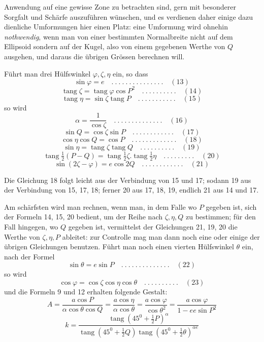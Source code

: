 %
Anwendung auf eine gewisse Zone zu betrachten sind, gern mit besonderer Sorgfalt und Schärfe auszuführen wünschen, und es verdienen daher einige dazu dienliche Umformungen hier einen Platz: eine Umformung wird ohnehin \textit{nothwendig}, wenn man von einer bestimmten Normalbreite nicht auf dem Ellipsoid sondern auf der Kugel, also von einem gegebenen Werthe von \(Q\) ausgehen, und daraus die übrigen Grössen berechnen will.

Führt man drei Hülfswinkel \(\varphi,\zeta,\eta\) ein, so dass
\[
\sin\varphi=e \quad .\ .\ .\ .\ .\ .\ .\ .\ .\ .\ .\ .\ .\ .\ .\quad(13)
\]
\[
\operatorname{tang}\zeta=\operatorname{tang}\varphi\cos P^2 \quad .\ .\ .\ .\ .\ .\ .\ .\ .\ .\quad(14)
\]
\[
\operatorname{tang}\eta=\sin\zeta\operatorname{tang}P \quad .\ .\ .\ .\ .\ .\ .\ .\ .\ .\ .\quad(15)
\]
so wird
\[
\alpha=\frac{1}{\cos\zeta} \quad .\ .\ .\ .\ .\ .\ .\ .\ .\ .\ .\ .\ .\ .\quad(16)
\]
\[
\sin Q=\cos\zeta\sin P \quad .\ .\ .\ .\ .\ .\ .\ .\ .\ .\ .\ .\quad(17)
\]
\[
\cos\eta\cos Q=\cos P \quad .\ .\ .\ .\ .\ .\ .\ .\ .\ .\ .\ .\ .\quad(18)
\]
\[
\sin\eta=\operatorname{tang}\zeta\operatorname{tang}Q \quad .\ .\ .\ .\ .\ .\ .\ .\ .\ .\quad(19)
\]
\[
\operatorname{tang}\tfrac{1}{2}(P-Q)=\operatorname{tang}\tfrac{1}{2}\zeta\mathord{.}\operatorname{tang}\tfrac{1}{2}\eta \quad .\ .\ .\ .\ .\ .\ .\ .\ .\quad(20)
\]
\[
\sin(2\zeta-\varphi)=e\cos2Q \quad .\ .\ .\ .\ .\ .\ .\ .\ .\ .\ .\ .\quad(21)
\]

Die Gleichung 18 folgt leicht aus der Verbindung von 15 und 17; sodann 19 aus der Verbindung von 15, 17, 18; ferner 20 aus 17, 18, 19, endlich 21 aus 14 und 17.

Am schärfsten wird man rechnen, wenn man, in dem Falle wo \(P\) gegeben ist, sich der Formeln 14, 15, 20 bedient, um der Reihe nach \(\zeta,\eta,Q\) zu bestimmen; für den Fall hingegen, wo \(Q\) gegeben ist, vermittelst der Gleichungen 21, 19, 20 die Werthe von \(\zeta,\eta,P\) ableitet: zur Controlle mag man dann noch eine oder einige der übrigen Gleichungen benutzen. Führt man noch einen vierten Hülfswinkel \(\theta\) ein, nach der Formel
\[
\sin\theta=e\sin P \quad .\ .\ .\ .\ .\ .\ .\ .\ .\ .\ .\ .\ .\ .\quad(22)
\]
so wird
\[
\cos\varphi=\cos\zeta\cos\eta\cos\theta \quad .\ .\ .\ .\ .\ .\ .\ .\ .\ .\quad(23)
\]
und die Formeln 9 und 12 erhalten folgende Gestalt:
\[
A=\frac{a\cos P}{\alpha\cos\theta\cos Q}=\frac{a\cos\eta}{\alpha\cos\theta}=\frac{a\cos\varphi}{\cos\theta^2}=\frac{a\cos\varphi}{1-ee\sin P^2}
\]
\[
k=\frac{\operatorname{tang}(45^0+\frac{1}{2}P)^\alpha}{\operatorname{tang}(45^0+\frac{1}{2}Q)\operatorname{tang}(45^0+\frac{1}{2}\theta)^{\alpha e}}
\]
